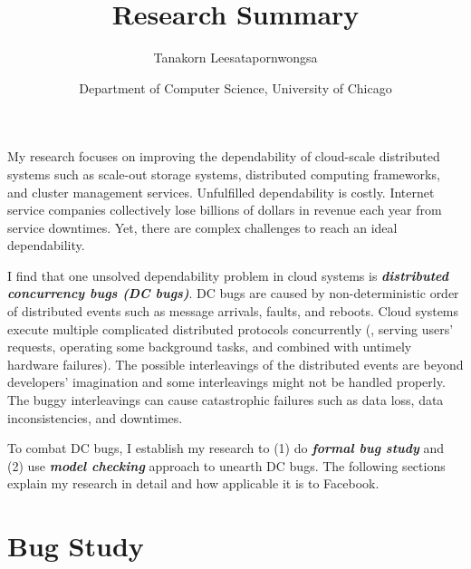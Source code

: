 \documentclass[11pt]{article}
\begin{document}
\title{Research Summary}
\author{Tanakorn Leesatapornwongsa}
\date{\vspace{-1ex} \small{Department of Computer Science, University of
Chicago}}

\maketitle

\vspace{-1ex} 
My research focuses on improving the dependability of cloud-scale distributed
systems such as scale-out storage systems, distributed computing frameworks,
and cluster management services. Unfulfilled dependability is costly. Internet
service companies collectively lose billions of dollars in revenue each year
from service downtimes. Yet, there are complex challenges to reach an ideal
dependability. 


I find that one unsolved dependability problem in cloud systems is
\textbf{\textit{distributed concurrency bugs (DC bugs)}}. DC bugs are caused by
non-deterministic order of distributed events such as message arrivals, faults,
and reboots. Cloud systems execute multiple complicated distributed protocols
concurrently (\eg, serving users' requests, operating some background tasks,
and combined with untimely hardware failures). The possible interleavings of the
distributed events are beyond developers' imagination and some interleavings
might not be handled properly. The buggy interleavings can cause catastrophic
failures such as data loss, data inconsistencies, and downtimes. 


To combat DC bugs, I establish my research to (1) do \textbf{\textit{formal bug
study}} and (2) use \textbf{\textit{model checking}} approach to unearth DC
bugs. The following sections explain my research in detail and how applicable
it is to Facebook.

\section{Bug Study}
\end{document}
